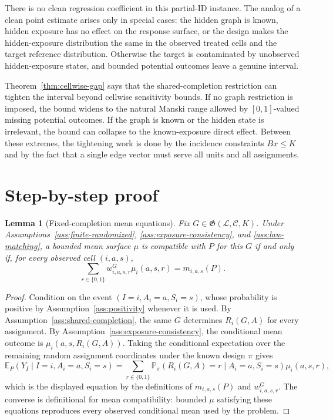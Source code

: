 \documentclass[11pt]{article}
\newcommand{\E}{\mathbb{E}}
\renewcommand{\Pr}{\mathbb{P}}
\theoremstyle{definition}
\theoremstyle{plain}
\newtheorem{lemma}{Lemma}
\theoremstyle{remark}
\begin{document}
There is no clean regression coefficient in this partial-ID instance.  The
analog of a clean point estimate arises only in special cases: the hidden graph
is known, hidden exposure has no effect on the response surface, or the design
makes the hidden-exposure distribution the same in the observed treated cells
and the target reference distribution.  Otherwise the target is contaminated by
unobserved hidden-exposure states, and bounded potential outcomes leave a
genuine interval.

Theorem~\ref{thm:cellwise-gap} says that the shared-completion restriction can
tighten the interval beyond cellwise sensitivity bounds.  If no graph
restriction is imposed, the bound widens to the natural Manski range allowed by
\([0,1]\)-valued missing potential outcomes.  If the graph is known or the
hidden state is irrelevant, the bound can collapse to the known-exposure direct
effect.  Between these extremes, the tightening work is done by the incidence
constraints \(Bx\le K\) and by the fact that a single edge vector must serve all
units and all assignments.

\section{Step-by-step proof}
\begin{lemma}[Fixed-completion mean equations]\label{lem:fixed-completion}
Fix \(G\in\mathfrak G(\mathcal L,\mathcal C,K)\).  Under
Assumptions~\ref{ass:finite-randomized}, \ref{ass:exposure-consistency}, and
\ref{ass:law-matching}, a bounded mean surface \(\mu\) is compatible with
\(P\) for this \(G\) if and only if, for every observed cell
\((i,a,s)\),
\[
\sum_{r\in\{0,1\}}w^G_{i,a,s,r}\mu_i(a,s,r)=m_{i,a,s}(P).
\]
\end{lemma}

\begin{proof}
Condition on the event \((I=i,A_i=a,S_i=s)\), whose probability is positive by
Assumption~\ref{ass:positivity} whenever it is used.  By
Assumption~\ref{ass:shared-completion}, the same \(G\) determines
\(R_i(G,A)\) for every assignment.  By
Assumption~\ref{ass:exposure-consistency}, the conditional mean outcome is
\(\mu_i(a,s,R_i(G,A))\).  Taking the conditional expectation over the remaining
random assignment coordinates under the known design \(\pi\) gives
\[
\E_P(Y_I\mid I=i,A_i=a,S_i=s)
=\sum_{r\in\{0,1\}}
\Pr_\pi(R_i(G,A)=r\mid A_i=a,S_i=s)\mu_i(a,s,r),
\]
which is the displayed equation by the definitions of \(m_{i,a,s}(P)\) and
\(w^G_{i,a,s,r}\).  The converse is definitional for mean compatibility:
bounded \(\mu\) satisfying these equations reproduces every observed conditional
mean used by the problem.
\end{proof}
\end{document}
